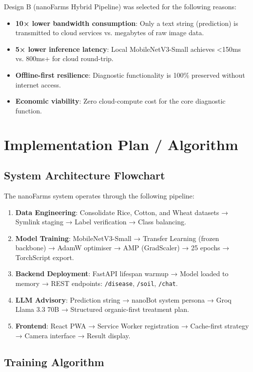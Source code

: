 \documentclass[12pt,oneside]{report}
\begin{document}
Design B (nanoFarms Hybrid Pipeline) was selected for the following reasons:
\begin{itemize}
    \item \textbf{10× lower bandwidth consumption}: Only a text string (prediction) is transmitted to cloud services vs. megabytes of raw image data.
    \item \textbf{5× lower inference latency}: Local MobileNetV3-Small achieves <150ms vs. 800ms+ for cloud round-trip.
    \item \textbf{Offline-first resilience}: Diagnostic functionality is 100\% preserved without internet access.
    \item \textbf{Economic viability}: Zero cloud-compute cost for the core diagnostic function.
\end{itemize}

\section{Implementation Plan / Algorithm}

\subsection{System Architecture Flowchart}

The nanoFarms system operates through the following pipeline:

\begin{enumerate}
    \item \textbf{Data Engineering}: Consolidate Rice, Cotton, and Wheat datasets → Symlink staging → Label verification → Class balancing.
    \item \textbf{Model Training}: MobileNetV3-Small → Transfer Learning (frozen backbone) → AdamW optimiser → AMP (GradScaler) → 25 epochs → TorchScript export.
    \item \textbf{Backend Deployment}: FastAPI lifespan warmup → Model loaded to memory → REST endpoints: \texttt{/disease}, \texttt{/soil}, \texttt{/chat}.
    \item \textbf{LLM Advisory}: Prediction string → nanoBot system persona → Groq Llama 3.3 70B → Structured organic-first treatment plan.
    \item \textbf{Frontend}: React PWA → Service Worker registration → Cache-first strategy → Camera interface → Result display.
\end{enumerate}

\subsection{Training Algorithm}
\end{document}
